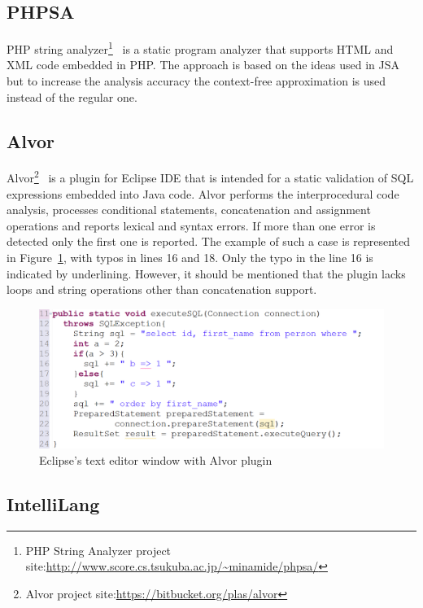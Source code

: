 \documentclass{sig-alternate-05-2015}
\begin{document}
\subsection{PHPSA}
PHP string analyzer\footnote{PHP String Analyzer project site:\url{http://www.score.cs.tsukuba.ac.jp/~minamide/phpsa/}}~\cite{PHPSA:ref} is a static program analyzer that supports HTML and XML code embedded in PHP. The approach is based on the ideas used in JSA but to increase the analysis accuracy the context-free approximation is used instead of the regular one.

\subsection{Alvor}

Alvor\footnote{Alvor project site:\url{https://bitbucket.org/plas/alvor}}~\cite{Alvor:ref} is a plugin for Eclipse IDE that is intended for a static validation of SQL expressions embedded into Java code. Alvor performs the interprocedural code analysis, processes conditional statements, concatenation and assignment operations and reports lexical and syntax errors. If more than one error is detected only the first one is reported. The example of such a case is represented in Figure~\ref{alvor_pic}, with typos in lines 16 and 18. Only the typo in the line 16 is indicated by underlining. However, it should be mentioned that the plugin lacks loops and string operations other than concatenation support.

\begin{figure}[h!]
    \begin{center}
        \includegraphics[scale=0.30]{Figures/Alvor.png}
    \end{center}
    \caption{Eclipse's text editor window with Alvor plugin}
    \label{alvor_pic}
\end{figure}

\subsection{IntelliLang}
\end{document}
